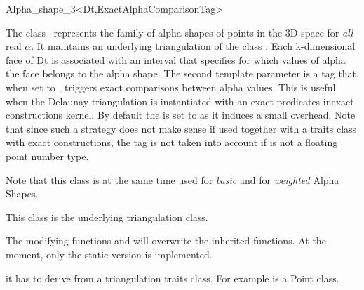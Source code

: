 \begin{ccRefClass} {Alpha_shape_3<Dt,ExactAlphaComparisonTag>}

\ccDefinition

The class \ccClassTemplateName\ represents the family of
alpha shapes of points in the 3D space for {\em all} real
$\alpha$. It maintains an  underlying triangulation 
of the class . Each k-dimensional face of Dt is associated with an
interval that specifies for which values of alpha the face belongs to the alpha shape.
The second template parameter  is a tag that, when set to
, triggers exact comparisons between alpha values. This is useful
when the Delaunay triangulation is instantiated with an exact predicates inexact constructions
kernel. By default the  is set to  as it induces a small
overhead. Note that since such a strategy does not make sense if used together with a traits class with exact constructions,
the tag  is not taken into account if  is not a floating point number type.

Note that this class is at the same time used for {\em basic} and
for {\em weighted} Alpha Shapes.


\ccInheritsFrom


This class is the underlying triangulation class.

The modifying functions  and  will overwrite
the inherited functions. At the moment, only the static version is implemented.

\ccTypes
{}
\ccThreeToTwo

it has to derive from a triangulation traits class.  
For example  is a Point class. 


\end{ccRefClass}
